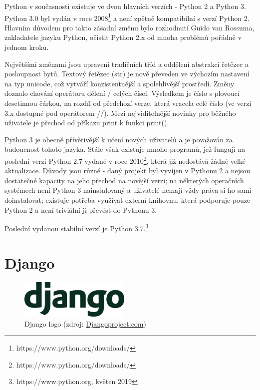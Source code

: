 Python v současnosti existuje ve dvou hlavních verzích - Python 2 a
Python 3. Python 3.0 byl vydán v roce
2008\footnote{https://www.python.org/downloads/} a není zpětně
kompatibilní s verzí Python 2. Hlavním důvodem pro takto zásadní změnu
bylo rozhodnutí Guido van Rossuma, zakladatele jazyku Python, očistit
Python 2.x od mnoha problémů pořádně v jednom kroku.

Největšími změnami jsou upravení tradičních tříd a oddělení abstrakcí
\textsf{řetězec} a \textsf{posloupnost bytů}. Textový řetězec
(\textsf{str}) je nově převeden ve výchozím nastavení na typ unicode,
což vytváří konzistentnější a spolehlivější prostředí. Změny doznalo
chování operátoru dělení \textsf{/} celých čísel. Výsledkem je číslo s
plovoucí desetinnou čárkou, na rozdíl od předchozí verze, která
vracela celé číslo (ve verzi 3.x dostupné pod operátorem
\textsf{//}). Mezi nejviditelnější novinky pro běžného uživatele je
přechod od příkazu \textsf{print} k funkci \textsf{print()}.

Python 3 je obecně přívětivější k učení nových uživatelů a je
považován za budoucnost tohoto jazyka. Stále však existuje mnoho
programů, jež fungují na poslední verzi Python 2.7 vydané v roce
2010\footnote{https://www.python.org/downloads/}, která již nedostává
žádné velké aktualizace. Důvody jsou různé - daný projekt byl vyvíjen
v Pythonu 2 a nejsou dostatečné kapacity na jeho přechod na novější
verzi; na některých operačních systémech není Python 3 nainstalovaný a
uživatelé nemají vždy práva si ho sami doinstalovat; existuje potřeba
využívat externí knihovnu, která podporuje pouze Python 2 a není
triviální ji převést do Pythonu 3.

Poslední vydanou stabilní verzí je Python
3.7.\footnote{https://www.python.org, květen 2019}

\section{Django}

\begin{figure}[H] \centering
      \includegraphics[width=150pt]{./pictures/django-logo-positive.png}
      \caption[Django logo]{Django logo (zdroj:
\href{https://static.djangoproject.com/img/logos/django-logo-positive.png}{Djangoproject.com})}
      \label{fig:django}
  \end{figure}

